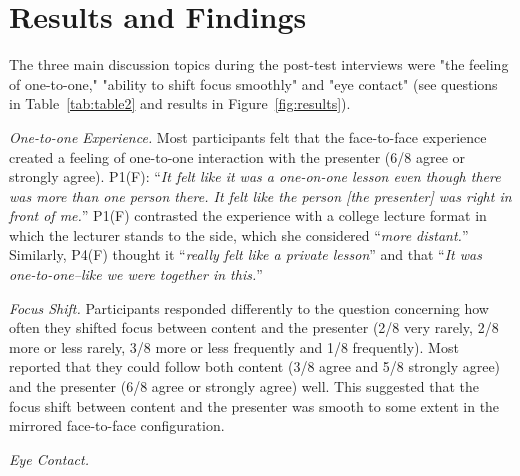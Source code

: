 \documentclass[sigchi-a]{acmart}
\begin{document}
\section{Results and Findings}

The three main discussion topics during the post-test interviews were "the feeling of one-to-one," "ability to shift focus smoothly" and "eye contact" (see questions in Table~\ref{tab:table2} and results in Figure~\ref{fig:results}). 

\textit{One-to-one Experience.}
Most participants felt that the face-to-face experience created a feeling of one-to-one interaction with the presenter (6/8 agree or strongly agree).
P1(F): ``\textit{It felt like it was a one-on-one lesson even though there was more than one person there. It felt like the person [the presenter] was right in front of me.}''
P1(F) contrasted the experience with a college lecture format in which the lecturer stands to the side, which she considered ``\textit{more distant.}'' 
Similarly, P4(F) thought it ``\textit{really felt like a private lesson}'' and that  ``\textit{It was one-to-one--like we were together in this.}''

\textit{Focus Shift.}
 Participants responded differently to the question concerning how often they shifted focus between content and the presenter (2/8 very rarely, 2/8 more or less rarely, 3/8 more or less frequently and 1/8 frequently).  Most reported that they could follow both content (3/8 agree and 5/8 strongly agree) and the presenter (6/8 agree or strongly agree) well. This suggested that the focus shift between content and the presenter was smooth to some extent in the mirrored face-to-face configuration.

\textit{Eye Contact.}
\end{document}
